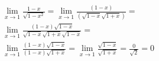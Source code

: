 \begin{ex}
\begin{align}
&\lim_{x\rightarrow 1} \frac{1-x}{\sqrt{1-x^2}}=\lim_{x\rightarrow 1}\frac{(1-x)}{(\sqrt{1-x}\sqrt{1+x})}=\nonumber\\
&\lim_{x\rightarrow 1} \frac{(1-x)\sqrt{1-x}}{\sqrt{1-x}\sqrt{1+x}\sqrt{1-x}}=\nonumber\\
&\lim_{x\rightarrow 1} \frac{(1-x)\sqrt{1-x}}{(1-x)\sqrt{1+x}}=\lim_{x\rightarrow 1}\frac{\sqrt{1-x}}{\sqrt{1+x}}=\frac{0}{\sqrt{2}}=0\nonumber
\end{align}
\end{ex}
